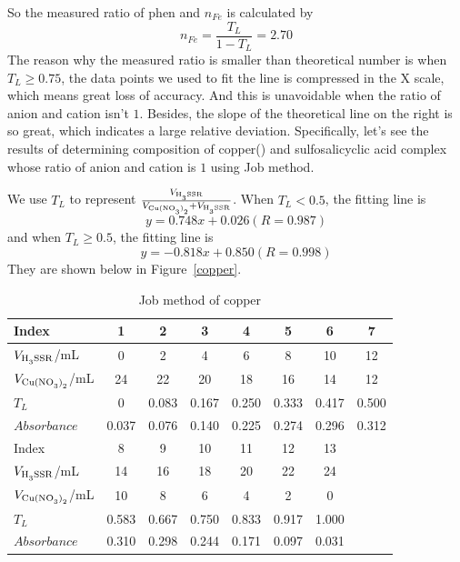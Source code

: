 So the measured ratio of phen and  $n_{Fe}$ is calculated by$$n_{Fe}=\frac{T_L}{1-T_L}=2.70$$The reason why the measured ratio is smaller than theoretical number is when $T_L\geq0.75$, the data points we used to fit the line is compressed in the X scale, which means great loss of accuracy. And this is unavoidable when the ratio of anion and cation isn't $1$. Besides, the slope of the theoretical line on the right is so great, which indicates a large relative deviation. Specifically, let's see the results of determining composition of copper(\uppercase\expandafter{}) and sulfosalicyclic acid complex whose ratio of anion and cation is $1$ using Job method.

We use $T_L$ to represent $\frac{V_{\ce{H3SSR}}}{V_{\ce{Cu(NO3)2}}+V_{\ce{H3SSR}}}$. When $T_L<0.5$, the fitting line is$$y=0.748x+0.026(R=0.987)$$and when $T_L\geq0.5$, the fitting line is$$y=-0.818x+0.850(R=0.998)$$They are shown below in Figure~\ref{copper}.

\begin{table}[H]
	\caption{Job method of copper}
	\label{Tab.Jbm2}
	\begin{tabular}{lccccccc}
	\toprule
	Index					&1		&2		&3		&4		&5		&6		&7		\\
	\midrule
	$V_{\ce{H3SSR}}$/mL 	&0		&2		&4		&6		&8		&10		&12		\\
	$V_{\ce{Cu(NO3)2}}$/mL  &24		&22		&20		&18		&16		&14		&12		\\
	$T_L$					&0		&0.083	&0.167	&0.250	&0.333	&0.417	&0.500	\\
	$Absorbance$ 			&0.037	&0.076	&0.140	&0.225	&0.274	&0.296	&0.312	\\
	\toprule
	Index					&8		&9		&10		&11		&12		&13		&\\
	\midrule
	$V_{\ce{H3SSR}}$/mL 	&14		&16		&18		&20		&22		&24		&\\
	$V_{\ce{Cu(NO3)2}}$/mL  &10		&8		&6		&4		&2		&0		&\\
	$T_L$					&0.583	&0.667	&0.750	&0.833	&0.917	&1.000	&\\
	$Absorbance$ 			&0.310	&0.298	&0.244	&0.171	&0.097	&0.031	&\\
	\bottomrule
	\end{tabular}
\end{table}

